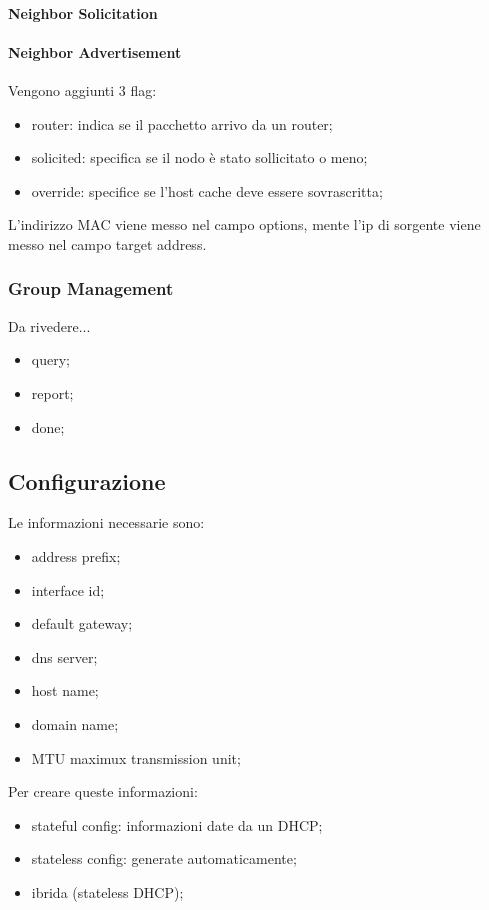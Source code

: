 \documentclass[12pt]{article}
\begin{document}
\paragraph{Neighbor Solicitation}



\paragraph{Neighbor Advertisement}
Vengono aggiunti 3 flag:
\begin{itemize}
    \item router: indica se il pacchetto arrivo da un router;
    \item solicited: specifica se il nodo \`e stato sollicitato o meno;
    \item override: specifice se l'host cache deve essere sovrascritta;
\end{itemize}
L'indirizzo MAC viene messo nel campo options, mente l'ip di sorgente viene messo nel campo target address.

\subsubsection{Group Management}
Da rivedere...
\begin{itemize}
    \item query;
    \item report;
    \item done;
\end{itemize}

\subsection{Configurazione}
Le informazioni necessarie sono:
\begin{itemize}
    \item address prefix;
    \item interface id;
    \item default gateway;
    \item dns server;
    \item host name;
    \item domain name;
    \item MTU maximux transmission unit;
\end{itemize}
Per creare queste informazioni:
\begin{itemize}
    \item stateful config: informazioni date da un DHCP;
    \item stateless config: generate automaticamente;
    \item ibrida (stateless DHCP);
\end{itemize}
\end{document}
